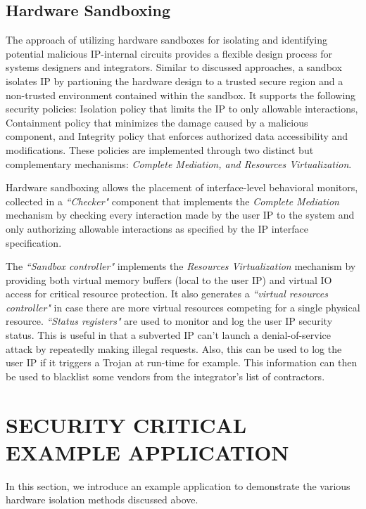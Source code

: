 \documentclass[sigconf]{acmart}
\theoremstyle{plain}
\theoremstyle{remark}
\begin{document}
\subsection{Hardware Sandboxing}\label{sec:HardwareSandbox}
The approach of utilizing hardware sandboxes for isolating and identifying potential malicious IP-internal circuits provides a flexible design process for systems designers and integrators. Similar to discussed approaches, a sandbox isolates IP by partioning the hardware design to a trusted secure region and a non-trusted environment contained within the sandbox. It supports the following security policies: Isolation policy that limits the IP to only allowable interactions, Containment policy that minimizes the damage caused by a malicious component, and Integrity policy that enforces authorized data accessibility and modifications. These policies are implemented through two distinct but complementary mechanisms: \textit{ Complete Mediation, and  Resources Virtualization}.

Hardware sandboxing allows the placement of interface-level behavioral monitors, collected in a \textit{``Checker"} component that implements the \textit{Complete Mediation} mechanism by checking every interaction made by the user IP to the system and only authorizing allowable interactions as specified by the IP interface specification.

The \textit{``Sandbox controller"} implements the \textit{Resources Virtualization} mechanism by providing both virtual memory buffers (local to the user IP) and virtual IO access for critical resource protection. It also generates a \textit{``virtual resources controller"} in case there are more virtual resources competing for a single physical resource. \textit{``Status registers"} are used to monitor and log the user IP security status. This is useful in that a subverted IP can't launch a denial-of-service attack by repeatedly making illegal requests. Also, this can be used to log the user IP if it triggers a Trojan at run-time for example. This information can then be used to blacklist some vendors from the integrator's list of contractors.




\section{SECURITY CRITICAL EXAMPLE APPLICATION} \label{sec:application}

In this section, we introduce an example application to demonstrate the various hardware isolation methods discussed above.
\end{document}
